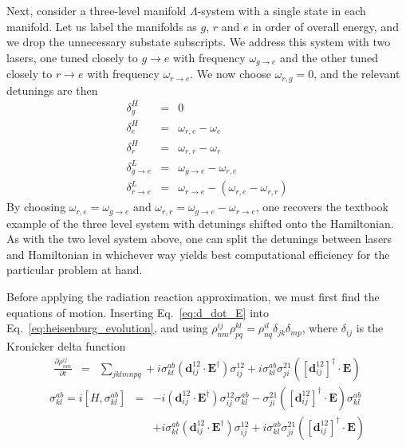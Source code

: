 \documentclass[final,5p,times,twocolumn]{elsarticle}
\begin{document}
Next, consider a three-level manifold $\Lambda$-system with a single state in each manifold.  Let us label the manifolds as $g$, $r$ and $e$ in order of overall energy, and we drop the unnecessary substate subscripts.  We address this system with two lasers, one tuned closely to $g\rightarrow e$ with frequency $\omega_{g\rightarrow e}$ and the other tuned closely to $r\rightarrow e$ with frequency $\omega_{r\rightarrow e}$.  We now choose $\omega_{r,g} = 0$, and the relevant detunings are then
\begin{eqnarray}
	\delta^H_g & = & 0 \\
	\delta^H_e & = & \omega_{r,e} - \omega_e \\
	\delta^H_r & = & \omega_{r,r} - \omega_r \\
	\delta^L_{g\rightarrow e} & = & \omega_{g\rightarrow e} - \omega_{r,e} \\
	\delta^L_{r\rightarrow e} & = & \omega_{r\rightarrow e} - (\omega_{r,e}-\omega_{r,r})
\end{eqnarray}
By choosing $\omega_{r,e} = \omega_{g\rightarrow e}$ and $\omega_{r,r} = \omega_{g\rightarrow e} - \omega_{r\rightarrow e}$, one recovers the textbook example of the three level system with detunings shifted onto the Hamiltonian.  As with the two level system above, one can split the detunings between lasers and Hamiltonian in whichever way yields best computational efficiency for the particular problem at hand.

Before applying the radiation reaction approximation, we must first find the equations of motion.  Inserting Eq.~\ref{eq:d_dot_E} into Eq.~\ref{eq:heisenburg_evolution}, and using $\rho^{ij}_{nm}\rho^{kl}_{pq} = \rho^{il}_{nq}\delta_{jk}\delta_{mp}$, where $\delta_{ij}$ is the Kronicker delta function
\begin{eqnarray}
	\frac{\partial \rho^{ij}_{nm}}{\partial t} & = & \sum_{jklmnpq}+i\sigma^{ab}_{kl}(\mathbf{d}^{12}_{ij}\cdot \mathbf{E}^\dagger)\sigma^{12}_{ij} +
		i\sigma^{ab}_{kl}\sigma^{21}_{ji} ([\mathbf{d}^{12}_{ij}]^\dagger\cdot \mathbf{E})
\end{eqnarray}
	\begin{eqnarray}
		\sigma^{ab}_{kl} = i[H, \sigma^{ab}_{kl}] & = & - i(\mathbf{d}^{12}_{ij}\cdot \mathbf{E}^\dagger )\sigma^{12}_{ij}\sigma^{ab}_{kl} - \sigma^{21}_{ji} ([\mathbf{d}^{12}_{ij}]^\dagger\cdot \mathbf{E}) \sigma^{ab}_{kl} \nonumber \\
		&  & +i\sigma^{ab}_{kl}(\mathbf{d}^{12}_{ij}\cdot \mathbf{E}^\dagger)\sigma^{12}_{ij} +
		i\sigma^{ab}_{kl}\sigma^{21}_{ji} ([\mathbf{d}^{12}_{ij}]^\dagger\cdot \mathbf{E})
	\end{eqnarray}
\end{document}
